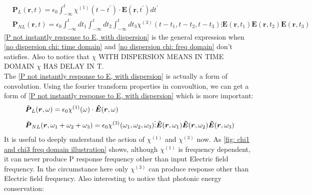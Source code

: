 \documentclass[12pt]{extarticle}
\numberwithin{equation}{section}
\numberwithin{figure}{section}
\numberwithin{table}{section}
\newcommand{\<}{\langle}
\renewcommand{\>}{\rangle}
\theoremstyle{definition}
\begin{document}
\begin{itemize}
\begin{subequations}
                    \begin{align}
                        &\boldsymbol{P}_L(\boldsymbol{r},t)=\epsilon_0\int_{-\infty}^t \chi^{(1)}(t-t^{'})\cdot\boldsymbol{E}(\boldsymbol{r},t^{'})dt^{'}\label{P not instantly response to E, with dispersion: linear part}\\
                        &\boldsymbol{P}_{NL}(\boldsymbol{r},t)=\epsilon_0\int_{-\infty}^t dt_1\int_{-\infty}^t dt_2\int_{-\infty}^t dt_3 \chi^{(3)}(t-t_1,t-t_2,t-t_3)\vdots \boldsymbol{E}(\boldsymbol{r},t_1)\boldsymbol{E}(\boldsymbol{r},t_2)\boldsymbol{E}(\boldsymbol{r},t_3)\label{P not instantly response to E, with dispersion: nonlinear part}
                    \end{align}
                    \label{P not instantly response to E, with dispersion}
                \end{subequations}
                \autoref{P not instantly response to E, with dispersion} is the general expression when \autoref{no dispersion chi: time domain} and \autoref{no dispersion chi: freq domain} don't satisfies. Also to notice that $\chi$ \MakeUppercase{with dispersion means in time domain} $\chi$ \MakeUppercase{has delay in t}. \\The \autoref{P not instantly response to E, with dispersion} is actually a form of convolution. Using the fourier transform properties in convoultion, we can get a form of \autoref{P not instantly response to E, with dispersion} which is more important:
                \begin{subequations}
                \begin{align}
                    &\Tilde{\boldsymbol{P}}_L(\boldsymbol{r},\omega)=\epsilon_0 \chi^{(1)}(\omega)\cdot \boldsymbol{\Tilde{E}}(\boldsymbol{r},\omega)\label{PL not instantly response to E: freq domain}\\
                    &\Tilde{\boldsymbol{P}}_{NL}(\boldsymbol{r},\omega_1+\omega_2+\omega_3)=\epsilon_0 \chi^{(3)}(\omega_1,\omega_2,\omega_3)\vdots \boldsymbol{\Tilde{E}}(\boldsymbol{r},\omega_1)\boldsymbol{\Tilde{E}}(\boldsymbol{r},\omega_2)\boldsymbol{\Tilde{E}}(\boldsymbol{r},\omega_3)\label{PNL not instantly response to EEE: freq domain}
                \end{align}
                \end{subequations}
                It is useful to deeply understand the action of $\chi^{(1)}$ and $\chi^{(3)}$ now. As \autoref{fig: chi1 and chi3 freq domain illustration} shows, although $\chi^{(1)}$ is frequency dependent, it can never produce P response frequency other than input Electric field frequency. In the circumstance here only $\chi^{(3)}$ can produce response other than Electric field frequency. Also interesting to notice that photonic energy conservation:

\end{itemize}
\end{document}
